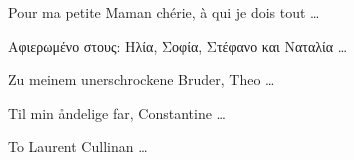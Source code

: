 \begin{dedication} 

\vspace{1cm}
{\selectfont \foreignlanguage{french} {Pour ma petite Maman ch\'erie, \`a qui je dois tout \ldots}}

\vspace{1cm}
{ \foreignlanguage{greek} { Αφιερωμένο στους: Ηλία, Σοφία, Στέφανο και Ναταλία \ldots} }

\vspace{1cm}
{ \foreignlanguage{german} {Zu meinem unerschrockene Bruder, Theo \ldots} }

\vspace{1cm}
{ \foreignlanguage{danish} {Til min åndelige far, Constantine \ldots} }

\vspace{1cm}
To Laurent Cullinan \ldots

\end{dedication}

